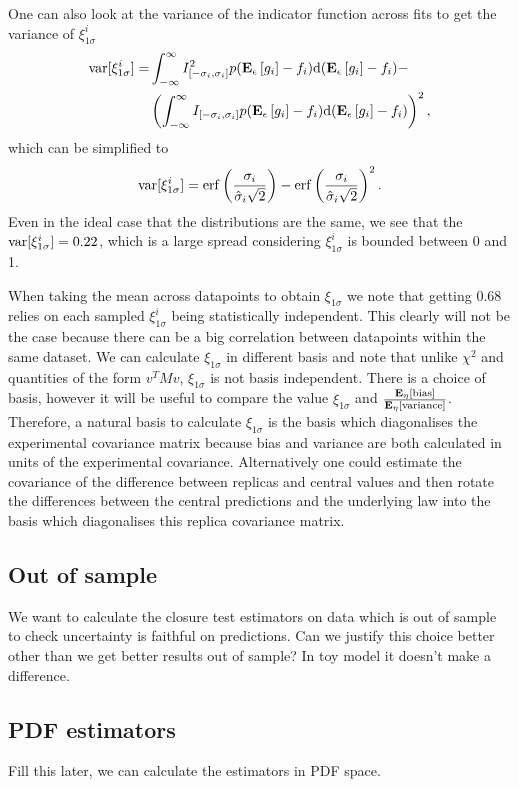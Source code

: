 One can also look at the variance of the indicator function across fits to
get the variance of $\xi_{1\sigma}^{i}$
\begin{equation}
    \begin{split}
        {\rm var}[\xi_{1\sigma}^{i}] =& \int_{-\infty}^{\infty} I_{[-\sigma_i, \sigma_i]}^2
        p(\mathbf{E}_{\epsilon}\left[ g_i \right] - f_i)
    {\rm d}(\mathbf{E}_{\epsilon}\left[ g_i \right] - f_i) - \\
    &\left( \int_{-\infty}^{\infty} I_{[-\sigma_i, \sigma_i]}
    p(\mathbf{E}_{\epsilon}\left[ g_i \right] - f_i)
    {\rm d}(\mathbf{E}_{\epsilon}\left[ g_i \right] - f_i) \right)^2,
    \end{split}
\end{equation}
which can be simplified to
\begin{equation}
    {\rm var}[\xi_{1\sigma}^{i}] =
    {\rm erf} \left( \frac{\sigma_i}{\hat{\sigma}_i \sqrt{2}}\right) -
    {\rm erf} \left( \frac{\sigma_i}{\hat{\sigma}_i \sqrt{2}}\right)^2.
\end{equation}
Even in the ideal case that the distributions are the same, we see that the
${\rm var}[\xi_{1\sigma}^{i}] = 0.22$, which is a large spread considering
$\xi_{1\sigma}^{i}$ is bounded between 0 and 1.

When taking the mean across datapoints to obtain $\xi_{1\sigma}$ we note that
getting 0.68 relies on each sampled $\xi_{1\sigma}^{i}$ being statistically
independent. This clearly will not be the case because there can be a big correlation
between datapoints within the same dataset. We can calculate $\xi_{1\sigma}$
in different basis and note that unlike $\chi^2$ and quantities of the form
$v^T M v$, $\xi_{1\sigma}$ is
not basis independent. There is a choice of basis, however it will be useful to
compare the value $\xi_{1\sigma}$ and $\frac{\mathbf{E}_{\eta}\left[ {\rm bias} \right]}{\mathbf{E}_{\eta}\left[ {\rm variance} \right]}$.
Therefore, a natural basis to calculate
$\xi_{1\sigma}$ is the basis which diagonalises the experimental covariance matrix
because bias and variance are both calculated in units of the experimental
covariance. Alternatively one could estimate the covariance of the difference
between replicas and central values and then rotate the differences between
the central predictions and the underlying law into the basis which diagonalises
this replica covariance matrix.

\subsection{Out of sample}

We want to calculate the closure test estimators on data which is out of sample
to check uncertainty is faithful on predictions. Can we justify this choice better
other than we get better results out of sample? In toy model it doesn't make a
difference.

\subsection{PDF estimators}

Fill this later, we can calculate the estimators in PDF space.
